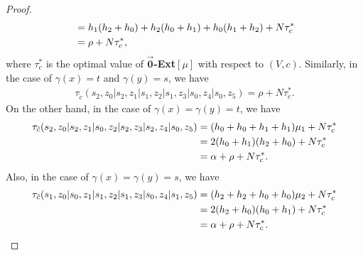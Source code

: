 \documentclass[11pt]{article}
\theoremstyle{definition}
\begin{document}
\begin{proof}
\begin{align}
&=h_1(h_2+h_0)+h_2(h_0+h_1)+h_0(h_1+h_2)+N\tau_c^*\notag\\
&=\rho+N\tau_c^*,
\end{align}
where $\tau_c^*$ is the optimal value of $\overrightarrow{\textbf{0}}$\textbf{-Ext}$[\mu]$ with respect to $(V,c)$. Similarly, in the case of $\gamma(x)=t$ and $\gamma(y)=s$, we have
\begin{align}
\label{eq:optimalassign2}
\tau_{\tilde{c}}(s_2,z_0|s_2,z_1|s_1,z_2|s_1,z_3|s_0,z_4|s_0,z_5)=\rho+N\tau_c^*.
\end{align}
On the other hand, in the case of $\gamma(x)=\gamma(y)=t$, we have
\begin{align}
    \tau_{\tilde{c}}(s_2,z_0|s_2,z_1|s_0,z_2|s_2,z_3|s_2,z_4|s_0,z_5)&=(h_0+h_0+h_1+h_1)\mu_1+N\tau_c^*\notag\\
    &=2(h_0+h_1)(h_2+h_0)+N\tau_c^*\notag\\
    &=\alpha+\rho+N\tau_c^*.
\end{align}
Also, in the case of $\gamma(x)=\gamma(y)=s$, we have
\begin{align}
    \tau_{\tilde{c}}(s_1,z_0|s_0,z_1|s_1,z_2|s_1,z_3|s_0,z_4|s_1,z_5)&=(h_2+h_2+h_0+h_0)\mu_2+N\tau_c^*\notag\\
    &=2(h_2+h_0)(h_0+h_1)+N\tau_c^*\notag\\
    &=\alpha+\rho+N\tau_c^*.
\end{align}


\end{proof}
\end{document}
